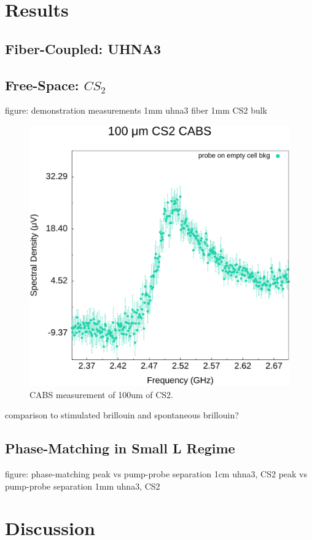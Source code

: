\section{Results}
\label{sec:CABS:Results}
\lipsum[1]

  \subsection{Fiber-Coupled: UHNA3}
  \label{subsec:CABS:Results:UHNA3}
  \lipsum[1]

  \subsection{Free-Space: \texorpdfstring{$CS_{2}$}{CS2}}
  \label{subsec:CABS:Results:CS2}
  \lipsum[1]
  figure: demonstration measurements
    1mm uhna3 fiber
    1mm CS2 bulk

    \begin{figure}[t]
        \centering
        \includegraphics[width=\textwidth]{figs/4-CABS/CABS-100um CS2.png}
        \caption{CABS measurement of 100um of CS2.}
        \label{fig:CABS 100um CS2}
    \end{figure}

    comparison to stimulated brillouin and spontaneous brillouin?

  \subsection{Phase-Matching in Small L Regime}
  \label{subsec:CABS:Results:Phase-Matching}
  \lipsum[1]
  figure: phase-matching
    peak vs pump-probe separation 1cm uhna3, CS2
    peak vs pump-probe separation 1mm uhna3, CS2

\section{Discussion}
\label{sec:CABS:Discussion}
\lipsum[1]

